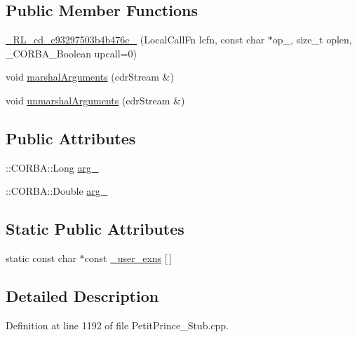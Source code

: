 \subsection*{Public Member Functions}
\begin{DoxyCompactItemize}
\item 
\hyperlink{class__0_r_l__cd__c93297503b4b476c__30000000_ae181c7b1d7848e49c70a52073b061400}{\+\_\+R\+L\+\_\+cd\+\_\+c93297503b4b476c\+\_} (Local\+Call\+Fn lcfn, const char $\ast$op\+\_\+, size\+\_\+t oplen, \+\_\+\+C\+O\+R\+B\+A\+\_\+\+Boolean upcall=0)
\item 
void \hyperlink{class__0_r_l__cd__c93297503b4b476c__30000000_a5acf7bd554776e260310ff9b60a28cc9}{marshal\+Arguments} (cdr\+Stream \&)
\item 
void \hyperlink{class__0_r_l__cd__c93297503b4b476c__30000000_a54388faf34b2345e350f1948e61fa147}{unmarshal\+Arguments} (cdr\+Stream \&)
\end{DoxyCompactItemize}
\subsection*{Public Attributes}
\begin{DoxyCompactItemize}
\item 
\+::C\+O\+R\+B\+A\+::\+Long \hyperlink{class__0_r_l__cd__c93297503b4b476c__30000000_a508ca8a434376dd8600660a60e41d84d}{arg\+\_}
\item 
\+::C\+O\+R\+B\+A\+::\+Double \hyperlink{class__0_r_l__cd__c93297503b4b476c__30000000_a84a569f3464f78e8a47f0c154dd7e164}{arg\+\_}
\end{DoxyCompactItemize}
\subsection*{Static Public Attributes}
\begin{DoxyCompactItemize}
\item 
static const char $\ast$const \hyperlink{class__0_r_l__cd__c93297503b4b476c__30000000_a49bdb6f8215069d7d5e9d5b93ab33cf5}{\+\_\+user\+\_\+exns} \mbox{[}$\,$\mbox{]}
\end{DoxyCompactItemize}


\subsection{Detailed Description}


Definition at line 1192 of file Petit\+Prince\+\_\+\+Stub.\+cpp.



